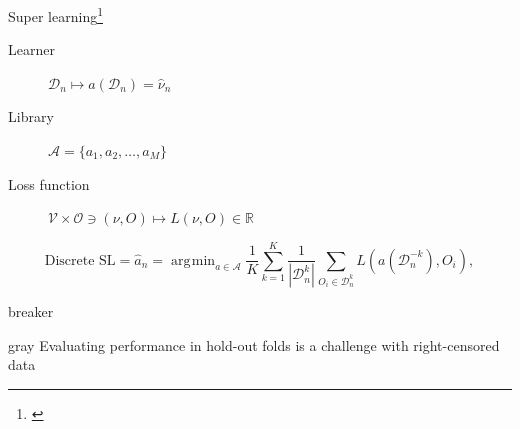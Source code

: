 \documentclass[smaller]{beamer}\usepackage{listings}
\newcommand{\R}{\mathbb{R}}
\newcommand{\1}{\mathds{1}}
\DeclareMathOperator*{\argmin}{\arg\!\min}
\begin{document}
\begin{frame}[label={sec:org3012b9a}]{Super learning\footnote{\cite{stone1974cross,geisser1975predictive,wolpert1992stacked,breiman1996stacked,van2007super}}}
\begin{onlyenv}
\begin{center}
\end{center}
\end{onlyenv}

\begin{block}{\color{white}{dummy}}
\begin{description}
\item[{Learner}] \(\mathcal{D}_n \longmapsto a(\mathcal{D}_n) = \hat
  \nu_n\)
\item[{Library}] \(\mathcal{A} = \{a_1, a_2, \dots, a_M \}\)
\item[{Loss function}] \(\mathcal{V} \times \mathcal{O} \ni (\nu,
  O) \longmapsto L(\nu, O) \in \R\)
\end{description}

\begin{equation*}
  \text{Discrete SL} = \hat{a}_n = \argmin_{a \in \mathcal{A}}
  \frac{1}{K}\sum_{k=1}^{K}
  \frac{1}{| \mathcal{D}_n^{k} |}\sum_{O_i \in \mathcal{D}_n^{k}}
  L
  {
    \left(
      a{ (\mathcal{D}_n^{-k})}
      , O_i
    \right)
  },
\end{equation*}
\end{block}
\end{frame}

\begin{frame}[label={sec:org29d1562}]{\color{white} breaker}
\begin{beamercolorbox}[rounded=true]{gray}
\centering \Large Evaluating performance in hold-out folds is
a challenge with right-censored data
\end{beamercolorbox}
\end{frame}
\end{document}
